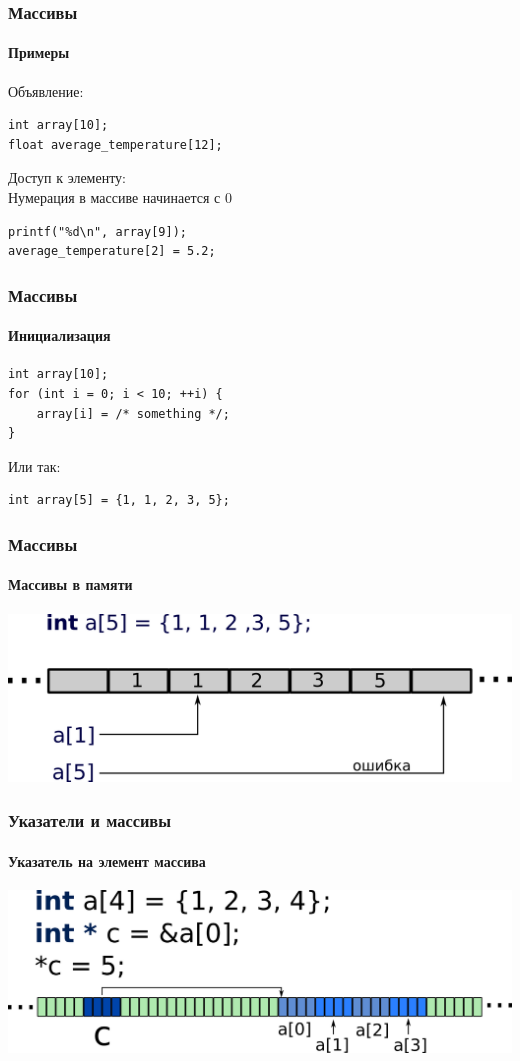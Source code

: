 \documentclass[12pt,pdf,hyperref={unicode}]{beamer}
\begin{document}
\begin{frame}[fragile]
\frametitle{Массивы} 
\framesubtitle{Примеры}
Объявление:\\
\begin{lstlisting}
int array[10];
float average_temperature[12];
\end{lstlisting}
Доступ к элементу:\\
Нумерация в массиве начинается с 0\\
\begin{lstlisting}
printf("%d\n", array[9]);
average_temperature[2] = 5.2;
\end{lstlisting}
\end{frame}

\begin{frame}[fragile]
\frametitle{Массивы} 
\framesubtitle{Инициализация}
\begin{lstlisting}
int array[10];
for (int i = 0; i < 10; ++i) {
    array[i] = /* something */;
}
\end{lstlisting}
Или так:\\
\begin{lstlisting}
int array[5] = {1, 1, 2, 3, 5};
\end{lstlisting}
\end{frame}

\begin{frame}[fragile]
\frametitle{Массивы} 
\framesubtitle{Массивы в памяти}
\begin{center}
\includegraphics[width=0.95\linewidth]{images/array_in_memory.png}
\end{center}
\end{frame}


\begin{frame}[fragile]
\frametitle{Указатели и массивы} 
\framesubtitle{Указатель на элемент массива}
\begin{center}
\includegraphics[width=0.95\linewidth]{images/memory_parrays_1.png}
\end{center}
\end{frame}
\end{document}
